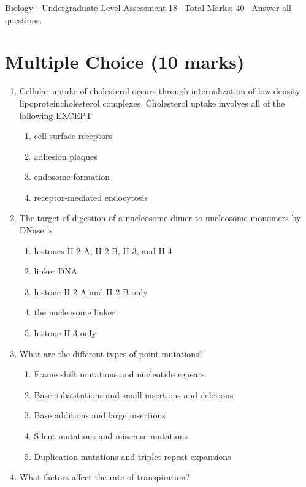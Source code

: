 \documentclass[12pt]{article}
\begin{document}
\begin{center}
Biology - Undergraduate Level Assessment 18 \
Total Marks: 40 \
Answer all questions.
\end{center}

\section*{Multiple Choice (10 marks)}
\begin{enumerate}[label=\arabic*.]
\item Cellular uptake of cholesterol occurs through internalization of low density lipoproteincholesterol complexes. Cholesterol uptake involves all of the following EXCEPT
\begin{enumerate}[label=(\alph*)]
    \item cell-surface receptors
    \item adhesion plaques
    \item endosome formation
    \item receptor-mediated endocytosis
\end{enumerate}
\item The target of digestion of a nucleosome dimer to nucleosome monomers by DNase is
\begin{enumerate}[label=(\alph*)]
    \item histones H 2 A, H 2 B, H 3, and H 4
    \item linker DNA
    \item histone H 2 A and H 2 B only
    \item the nucleosome linker
    \item histone H 3 only
\end{enumerate}
\item What are the different types of point mutations?
\begin{enumerate}[label=(\alph*)]
    \item Frame shift mutations and nucleotide repeats
    \item Base substitutions and small insertions and deletions
    \item Base additions and large insertions
    \item Silent mutations and missense mutations
    \item Duplication mutations and triplet repeat expansions
\end{enumerate}
\item What factors affect the rate of transpiration?
\begin{enumerate}[label=(\alph*)]

\end{enumerate}
\end{enumerate}
\end{document}

